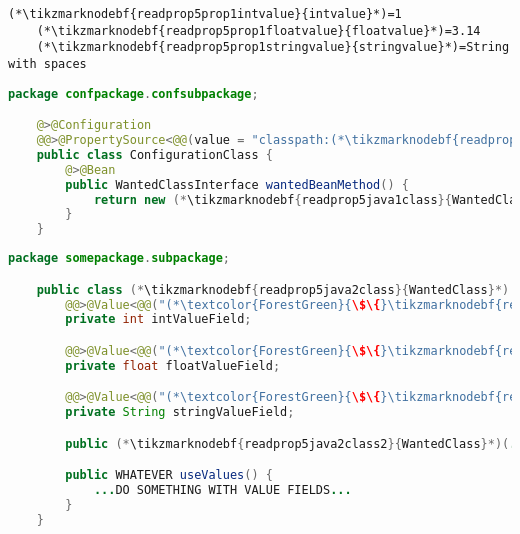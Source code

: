 \begin{lstlisting}[title={A \mboxtextit{.properties} file called \tikzmarknodebf{readprop5prop1filename}{\textit{annotations.properties}}}]
    (*\tikzmarknodebf{readprop5prop1intvalue}{intvalue}*)=1
    (*\tikzmarknodebf{readprop5prop1floatvalue}{floatvalue}*)=3.14
    (*\tikzmarknodebf{readprop5prop1stringvalue}{stringvalue}*)=String with spaces
\end{lstlisting}
\begin{lstlisting}[language=Java, title={Configuration class}]
    package confpackage.confsubpackage;

    @>@Configuration
    @@>@PropertySource<@@(value = "classpath:(*\tikzmarknodebf{readprop5java1filename}{annotations.properties}[ForestGreen]*)", encoding = "utf-8")
    public class ConfigurationClass {
        @>@Bean
        public WantedClassInterface wantedBeanMethod() {
            return new (*\tikzmarknodebf{readprop5java1class}{WantedClass}*)(...);
        }
    }
\end{lstlisting}
\begin{lstlisting}[language=Java, title={Wanted class with any constructor}]
    package somepackage.subpackage;

    public class (*\tikzmarknodebf{readprop5java2class}{WantedClass}*) implements WantedClassInterface {
        @@>@Value<@@("(*\textcolor{ForestGreen}{\$\{}\tikzmarknodebf{readprop5java2intvalue}{intvalue}[ForestGreen]\textcolor{ForestGreen}{\}}*)")
        private int intValueField;

        @@>@Value<@@("(*\textcolor{ForestGreen}{\$\{}\tikzmarknodebf{readprop5java2floatvalue}{floatvalue}[ForestGreen]\textcolor{ForestGreen}{\}}*)")
        private float floatValueField;

        @@>@Value<@@("(*\textcolor{ForestGreen}{\$\{}\tikzmarknodebf{readprop5java2stringvalue}{stringvalue}[ForestGreen]\textcolor{ForestGreen}{\}}*)")
        private String stringValueField;

        public (*\tikzmarknodebf{readprop5java2class2}{WantedClass}*)(...) {...}

        public WHATEVER useValues() {
            ...DO SOMETHING WITH VALUE FIELDS...
        }
    }
\end{lstlisting}
\newpage